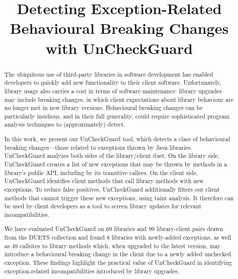 \documentclass[conference]{IEEEtran}
\begin{document}
	\title {Detecting Exception-Related Behavioural Breaking Changes with UnCheckGuard}


    \maketitle
    \thispagestyle{plain}
    \pagestyle{plain}

    \begin{abstract}
      The ubiquitous use of third-party libraries in software development has enabled developers to quickly add
      new functionality to their client software. Unfortunately, library usage also carries a cost in
      terms of software maintenance: library upgrades may include breaking changes, in which client expectations
      about library behaviour are no longer met in new library versions. Behavioural breaking
      changes can be particularly insidious, and in their full generality, could require sophisticated program
      analysis techniques to (approximately) detect.

      In this work, we present our UnCheckGuard tool, which detects a class of behavioural breaking changes---those
      related to exceptions thrown by Java libraries. UnCheckGuard analyzes both sides of the library/client
      duet. On the library side, UnCheckGuard creates a list of new exceptions that may be thrown by methods
      in a library's public API, including by its transitive callees. On the client side, UnCheckGuard identifies
      client methods that call library methods with new exceptions. To reduce false positives, UnCheckGuard
      additionally filters out client methods that cannot trigger these new exceptions, using taint analysis. It therefore can be
      used by client developers as a tool to screen library updates for relevant incompatibilities.

      We have evaluated UnCheckGuard on 69 libraries and 99 library-client pairs drawn from the DUETS collection
      and found 8 libraries with newly-added exceptions, as well as 49 callsites to library methods which,
      when upgraded to the latest version, may introduce
      a behavioural breaking change in the client due to a newly added unchecked exception. These findings
      highlight the practical value of UnCheckGuard in identifying exception-related incompatibilities
      introduced by library upgrades.


    \end{abstract}
    
\end{document}
